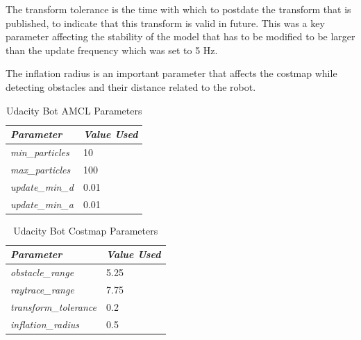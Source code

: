 \documentclass[10pt,journal,compsoc]{IEEEtran}
\begin{document}
The transform tolerance is the time with which to postdate the transform that is published, to indicate that this transform is valid in future. This was a key parameter affecting the stability of the model that has to be modified to be larger than the update frequency which was set to 5 Hz.

The inflation radius is an important parameter that affects the costmap while detecting obstacles and their distance related to the robot. 

\begin{table}[h]
\renewcommand{\arraystretch}{1.5}
\centering
\begin{tabular}{|l|l|}
\hline
\textit{\textbf{Parameter}} & \textit{\textbf{Value Used}} \\ \hline
\textit{min\_particles}     & 10                           \\ \hline
\textit{max\_particles}     & 100                          \\ \hline
\textit{update\_min\_d}     & 0.01                         \\ \hline
\textit{update\_min\_a}     & 0.01                         \\ \hline
\end{tabular}
\vspace{5pt}
\caption{Udacity Bot AMCL Parameters}
\label{table:amcl-params-udacity-bot}
\end{table}

\begin{table}[h]
\renewcommand{\arraystretch}{1.5}
\centering
\begin{tabular}{|l|l|}
\hline
\textit{\textbf{Parameter}}   & \textit{\textbf{Value Used}} \\ \hline
\textit{obstacle\_range}      & 5.25                         \\ \hline
\textit{raytrace\_range}      & 7.75                         \\ \hline
\textit{transform\_tolerance} & 0.2                          \\ \hline
\textit{inflation\_radius}    & 0.5                          \\ \hline
\end{tabular}
\vspace{5pt}
\caption{Udacity Bot Costmap Parameters}
\label{table:cost-params-udacity-bot}
\end{table}
\end{document}
